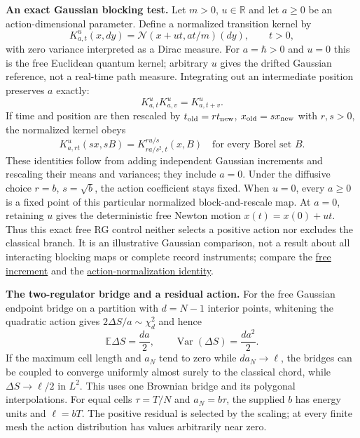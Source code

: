 \documentclass[11pt,a4paper]{article}
\begin{document}
\textbf{An exact Gaussian blocking test.} Let \(m>0\), \(u\in\mathbb R\)
and let \(a\ge0\) be an action-dimensional parameter. Define a
normalized transition kernel by
\[K^u_{a,t}(x,dy)=\mathcal N(x+ut,at/m)(dy),\qquad t>0,\] with zero
variance interpreted as a Dirac measure. For \(a=\hbar>0\) and \(u=0\)
this is the free Euclidean quantum kernel; arbitrary \(u\) gives the
drifted Gaussian reference, not a real-time path measure. Integrating
out an intermediate position preserves \(a\) exactly:
\[K^u_{a,t}K^u_{a,v}=K^u_{a,t+v}.\] If time and position are then
rescaled by \(t_{\rm old}=r t_{\rm new}\), \(x_{\rm old}=s x_{\rm new}\)
with \(r,s>0\), the normalized kernel obeys \[
 K^u_{a,rt}(sx,sB)=K^{ru/s}_{ra/s^2,t}(x,B)
 \quad\text{for every Borel set }B.
\] These identities follow from adding independent Gaussian increments
and rescaling their means and variances; they include \(a=0\). Under the
diffusive choice \(r=b\), \(s=\sqrt b\), the action coefficient stays
fixed. When \(u=0\), every \(a\ge0\) is a fixed point of this particular
normalized block-and-rescale map. At \(a=0\), retaining \(u\) gives the
deterministic free Newton motion \(x(t)=x(0)+ut\). Thus this exact free
RG control neither selects a positive action nor excludes the classical
branch. It is an illustrative Gaussian comparison, not a result about
all interacting blocking maps or complete record instruments; compare
the \href{groupoid-quantum-newton-states.md}{free increment} and the
\href{refinement-composition-and-limit.md}{action-normalization
identity}.

\textbf{The two-regulator bridge and a residual action.} For the free
Gaussian endpoint bridge on a partition with \(d=N-1\) interior points,
whitening the quadratic action gives \(2\Delta S/a\sim\chi_d^2\) and
hence \[\mathbb E\Delta S=\frac{da}{2},\qquad
  \operatorname{Var}(\Delta S)=\frac{da^2}{2}.\] If the maximum cell
length and \(a_N\) tend to zero while \(d a_N\to\ell\), the bridges can
be coupled to converge uniformly almost surely to the classical chord,
while \(\Delta S\to\ell/2\) in \(L^2\). This uses one Brownian bridge
and its polygonal interpolations. For equal cells \(\tau=T/N\) and
\(a_N=b\tau\), the supplied \(b\) has energy units and \(\ell=bT\). The
positive residual is selected by the scaling; at every finite mesh the
action distribution has values arbitrarily near zero.
\end{document}
